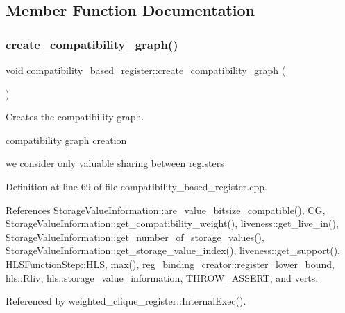 \subsection{Member Function Documentation}
\mbox{\label{classcompatibility__based__register_afe19d2dd6d74dd1cee14ef01a3035c8e}} 
\subsubsection{\texorpdfstring{create\+\_\+compatibility\+\_\+graph()}{create\_compatibility\_graph()}}
{\footnotesize\ttfamily void compatibility\+\_\+based\+\_\+register\+::create\+\_\+compatibility\+\_\+graph (\begin{DoxyParamCaption}{ }\end{DoxyParamCaption})}



Creates the compatibility graph. 

compatibility graph creation

we consider only valuable sharing between registers 

Definition at line 69 of file compatibility\+\_\+based\+\_\+register.\+cpp.



References Storage\+Value\+Information\+::are\+\_\+value\+\_\+bitsize\+\_\+compatible(), CG, Storage\+Value\+Information\+::get\+\_\+compatibility\+\_\+weight(), liveness\+::get\+\_\+live\+\_\+in(), Storage\+Value\+Information\+::get\+\_\+number\+\_\+of\+\_\+storage\+\_\+values(), Storage\+Value\+Information\+::get\+\_\+storage\+\_\+value\+\_\+index(), liveness\+::get\+\_\+support(), H\+L\+S\+Function\+Step\+::\+H\+LS, max(), reg\+\_\+binding\+\_\+creator\+::register\+\_\+lower\+\_\+bound, hls\+::\+Rliv, hls\+::storage\+\_\+value\+\_\+information, T\+H\+R\+O\+W\+\_\+\+A\+S\+S\+E\+RT, and verts.



Referenced by weighted\+\_\+clique\+\_\+register\+::\+Internal\+Exec().


